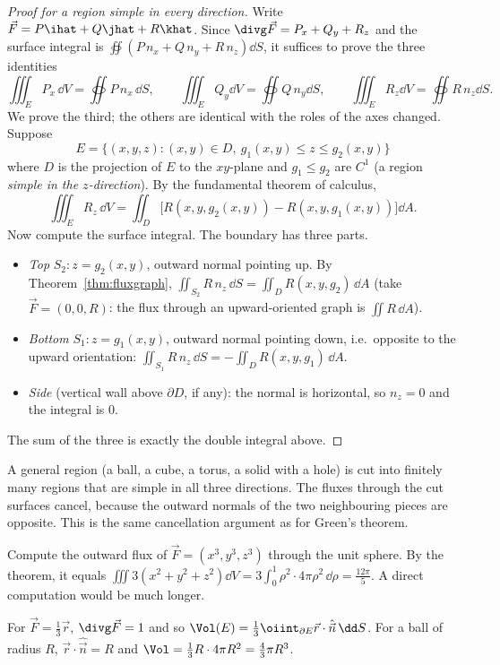 \begin{proof}[Proof for a region simple in every direction]
Write $\vec F=P\ihat+Q\jhat+R\khat$. Since $\divg\vec F=P_x+Q_y+R_z$ and the surface integral is $\oiint(P\,n_x+Q\,n_y+R\,n_z)\dd S$, it suffices to prove the three identities
\[
\iiint_EP_x\,\dd V=\oiint P\,n_x\,\dd S,\qquad\iiint_EQ_y\dd V=\oiint Q\,n_y\dd S,\qquad\iiint_ER_z\dd V=\oiint R\,n_z\dd S .
\]
We prove the third; the others are identical with the roles of the axes changed. Suppose
\[
E=\{(x,y,z):(x,y)\in D,\ g_1(x,y)\le z\le g_2(x,y)\}
\]
where $D$ is the projection of $E$ to the $xy$-plane and $g_1\le g_2$ are $C^1$ (a region \emph{simple in the $z$-direction}). By the fundamental theorem of calculus,
\[
\iiint_ER_z\,\dd V=\iint_D\bigl[R(x,y,g_2(x,y))-R(x,y,g_1(x,y))\bigr]\dd A .
\]
Now compute the surface integral. The boundary has three parts.
\begin{itemize}
  \item \emph{Top} $S_2:z=g_2(x,y)$, outward normal pointing up. By Theorem~\ref{thm:fluxgraph}, $\iint_{S_2}R\,n_z\,\dd S=\iint_DR(x,y,g_2)\,\dd A$ (take $\vec F=(0,0,R)$: the flux through an upward-oriented graph is $\iint R\,\dd A$).
  \item \emph{Bottom} $S_1:z=g_1(x,y)$, outward normal pointing down, i.e.\ opposite to the upward orientation: $\iint_{S_1}R\,n_z\,\dd S=-\iint_DR(x,y,g_1)\,\dd A$.
  \item \emph{Side} (vertical wall above $\partial D$, if any): the normal is horizontal, so $n_z=0$ and the integral is $0$.
\end{itemize}
The sum of the three is exactly the double integral above.
\end{proof}

A general region (a ball, a cube, a torus, a solid with a hole) is cut into finitely many regions that are simple in all three directions. The fluxes through the cut surfaces cancel, because the outward normals of the two neighbouring pieces are opposite. This is the same cancellation argument as for Green's theorem.

\begin{example}
Compute the outward flux of $\vec F=(x^3,y^3,z^3)$ through the unit sphere. By the theorem, it equals $\iiint3(x^2+y^2+z^2)\dd V=3\int_0^1\rho^2\cdot4\pi\rho^2\,\dd\rho=\frac{12\pi}5$. A direct computation would be much longer.
\end{example}

\begin{example}
For $\vec F=\frac13\vec r$, $\divg\vec F=1$ and so $\Vol(E)=\frac13\oiint_{\partial E}\vec r\cdot\hat{\vec n}\,\dd S$. For a ball of radius $R$, $\vec r\cdot\hat{\vec n}=R$ and $\Vol=\frac13R\cdot4\pi R^2=\frac43\pi R^3$.
\end{example}

